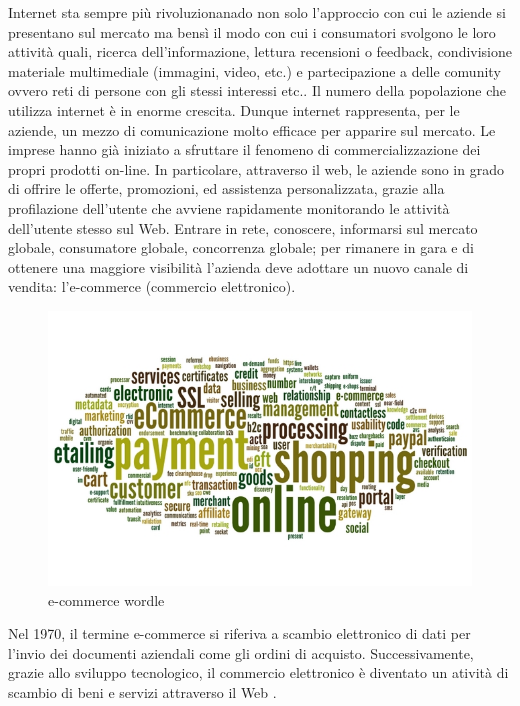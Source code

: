 Internet sta sempre più rivoluzionanado non solo l'approccio con cui le aziende si presentano sul mercato ma bensì il modo con cui i consumatori svolgono le loro attività quali, ricerca dell'informazione, lettura recensioni o feedback, condivisione materiale multimediale (immagini, video, etc.) e partecipazione a delle comunity ovvero reti di persone con gli stessi interessi etc..
\newline
Il numero della popolazione che utilizza internet è in enorme crescita. Dunque internet rappresenta, per le aziende, un mezzo di comunicazione molto efficace per apparire sul mercato.
Le imprese hanno già iniziato a sfruttare il fenomeno di commercializzazione dei propri prodotti on-line. In particolare, attraverso il web, le aziende sono in grado di offrire le offerte, promozioni, ed assistenza personalizzata, grazie alla profilazione dell'utente che avviene rapidamente monitorando le attività dell'utente stesso sul Web.
\newline
Entrare in rete, conoscere, informarsi sul mercato globale, consumatore globale, concorrenza globale; per rimanere in gara e di ottenere una maggiore visibilità l'azienda deve adottare un nuovo canale di vendita: l'e-commerce (commercio elettronico).
\begin{figure}[htb]
 \centering
 \includegraphics[width=1.0\linewidth]{images/introduction/ecommerce-wordle.jpg}\hfill
 \caption[e-commerce wordle]{e-commerce wordle}
 \label{fig:e_commerce_wordle}
\end{figure}
Nel 1970, il termine e-commerce si riferiva a scambio elettronico di dati per l'invio dei documenti aziendali come gli ordini di acquisto. Successivamente, grazie allo sviluppo tecnologico, il commercio elettronico è diventato un atività di scambio di beni e servizi attraverso il Web \cite{commerce_intro_1}.
